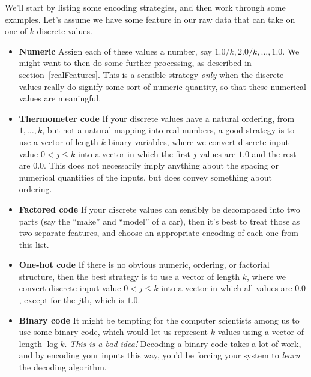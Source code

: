 We'll start by listing some encoding strategies, and then work through
some examples. Let's assume we have some feature in our raw data that
can take on one of $k$ discrete values.
\begin{itemize}
\item{\bf Numeric}  Assign each of these values a number, say $1.0/k,
  2.0/k, \ldots, 1.0$.  We might want to then do some further processing, as
  described in section~\ref{realFeatures}.  This is a sensible
  strategy {\em only} when the discrete values really do signify some
  sort of numeric quantity, so that these numerical values are meaningful.

\item{\bf Thermometer code}  If your discrete values have a natural
  ordering, from $1, \ldots, k$, but not a natural mapping into real
  numbers, a good strategy is to use a vector of length $k$ binary
  variables, where we convert discrete input value $0 < j \leq k$ into
  a vector in which the first $j$ values are $1.0$ and the rest are
  $0.0$.  This does not necessarily imply anything about the spacing
  or numerical quantities of the inputs, but does convey something
  about ordering.

\item{\bf Factored code}  If your discrete values can sensibly be
  decomposed into two parts (say the ``make'' and ``model'' of a car),
  then it's best to treat those as two separate features, and choose
  an appropriate encoding of each one from this list.

\item{\bf One-hot code}  If there is no obvious numeric, ordering, or
  factorial structure, then the best strategy is to use a vector of
  length $k$, where we convert discrete input value $0 < j \leq k$
  into a vector in which all values are $0.0$, except for the $j$th,
  which is $1.0$.

\item{\bf Binary code} It might be tempting for the computer
  scientists among us to use some binary code, which would let us
  represent $k$ values using a vector of length $\log k$.  {\em This
    is a bad idea!}  Decoding a binary code takes a lot of work, and
  by encoding your inputs this way, you'd be forcing your system to 
  {\em learn} the decoding algorithm.
\end{itemize}

